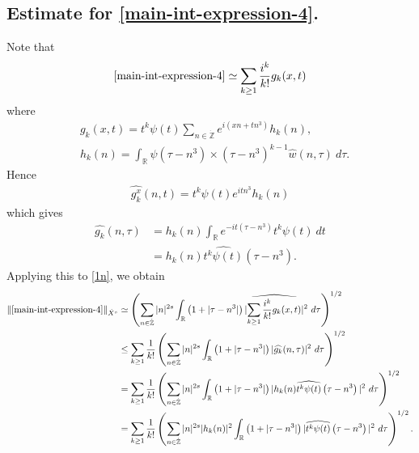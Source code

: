 \documentclass[12pt,reqno]{amsart}
\numberwithin{equation}{section}  %
\numberwithin{figure}{section}
\newcommand{\rr}{\mathbb{R}}
\newcommand{\zz}{\mathbb{Z}}
\newcommand{\zzdot}{\dot{\zz}}
\newcommand{\wh}{\widehat}
\theoremstyle{plain}
\theoremstyle{definition}
\theoremstyle{remark}
\begin{document}
\subsection{Estimate for \eqref{main-int-expression-4}.}
Note that
%
%
\begin{equation}
	\label{1n}
	\begin{split}
		\eqref{main-int-expression-4} \simeq \sum_{k \ge 1}
		\frac{i^k}{k!}g_k(x,t)
	\end{split}
\end{equation}
%
%
where 
%
%
\begin{equation*}
	\begin{split}
		& g_k(x,t) = t^k \psi(t) \sum_{n \in \zzdot} e^{i\left( xn + tn^{3}
		\right)} h_k(n),
		\\
		& h_k(n) = \int_\rr \psi \left( \tau - n^3 \right) \times \left(
		\tau - n^3 \right)^{k -1} \wh{w}(n, \tau) \ d \tau.
	\end{split}
\end{equation*}
%
%
Hence
%
%
\begin{equation*}
	\begin{split}
		\wh{g_k^x}(n, t) = t^{k} \psi(t) e^{i t n^3} h_k(n)
	\end{split}
\end{equation*}
%
%
which gives
%
%
\begin{equation*}
	\begin{split}
		\wh{g_k}(n, \tau)
		& = h_k(n) \int_\rr e^{-it\left( \tau - n^3 \right)}
		t^{k}\psi(t) \ dt
		\\
		& = h_k(n) \wh{t^{k}\psi(t)} \left( \tau - n^3 \right).
	\end{split}
\end{equation*}
%
%
Applying this to \eqref{1n}, we obtain
%
%
\begin{equation}
	\label{2n}
	\begin{split}
		\|\eqref{main-int-expression-4}\|_{\dot{X}^s} 
		& \simeq \left( \sum_{n \in \zzdot} |n|^{2s} \int_\rr \left( 1 + | \tau -
		n^3
		|
		\right) | \wh{\sum_{k \ge 1} \frac{i^k}{k!}g_k(x,t)} |^2 \ d \tau
		\right)^{1/2}
		\\
		& \le \sum_{k \ge 1} \frac{1}{k!}\left( \sum_{n \in \zzdot} |n|^{2s}
		\int_\rr \left( 1 + | \tau - n^3 | \right) | \wh{g_k}(n, \tau) |^2 \
		d \tau \right)^{1/2}
		\\
		& = \sum_{k \ge 1} \frac{1}{k!} \left( \sum_{n \in \zzdot} |n|^{2s}
		\int_\rr \left( 1 + | \tau - n^3 | \right) | h_k(n) \wh{t^k
		\psi(t)} \left( \tau - n^3 \right) |^2 \ d \tau \right)^{1/2}
		\\
		& = \sum_{k \ge 1} \frac{1}{k!} \left( \sum_{n \in \zzdot} |n|^{2s} |
		h_k(n) |^2 \int_\rr \left( 1 + | \tau - n^3 | \right) | \wh{t^k
		\psi(t)} \left( \tau - n^3 \right) |^2 \ d \tau \right)^{1/2}.
	\end{split}
\end{equation}
\end{document}
